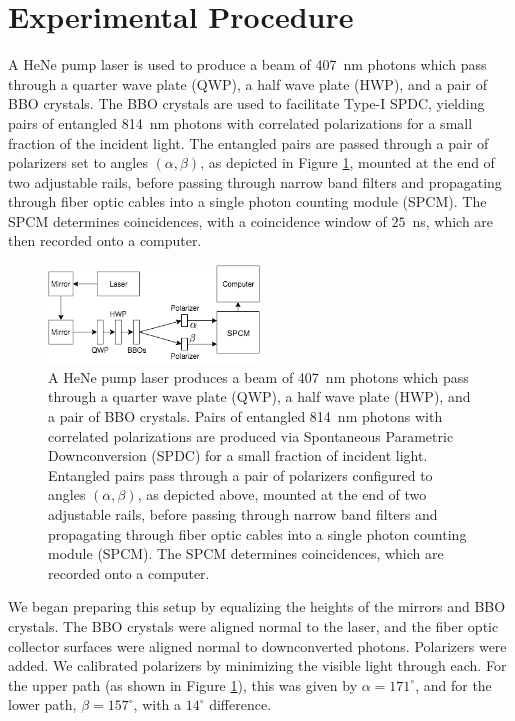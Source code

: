\documentclass{article}
\let\Oldsection\section
\renewcommand{\section}{\FloatBarrier\Oldsection}
\begin{document}
\section{Experimental Procedure}

A HeNe pump laser is used to produce a beam of 407~nm photons which pass through a quarter wave plate (QWP), a half wave plate (HWP), and a pair of BBO crystals. The BBO crystals are used to facilitate Type-I SPDC, yielding pairs of entangled 814~nm photons with correlated polarizations for a small fraction of the incident light. The entangled pairs are passed through a pair of polarizers set to angles $(\alpha, \beta)$, as depicted in Figure \ref{fig:setup}, mounted at the end of two adjustable rails, before passing through narrow band filters and propagating through fiber optic cables into a single photon counting module (SPCM). The SPCM determines coincidences, with a coincidence window of $25$~ns, which are then recorded onto a computer.

\begin{figure}[!h]
  \centering
  \includegraphics[width=0.5\textwidth]{setup}
  \caption{A HeNe pump laser produces a beam of 407~nm photons which pass through a quarter wave plate (QWP), a half wave plate (HWP), and a pair of BBO crystals. Pairs of entangled 814~nm photons with correlated polarizations are produced via Spontaneous Parametric Downconversion (SPDC) for a small fraction of incident light. Entangled pairs pass through a pair of polarizers configured to angles $(\alpha, \beta)$, as depicted above, mounted at the end of two adjustable rails, before passing through narrow band filters and propagating through fiber optic cables into a single photon counting module (SPCM). The SPCM determines coincidences, which are recorded onto a computer. \label{fig:setup}}
\end{figure}

We began preparing this setup by equalizing the heights of the mirrors and BBO crystals. The BBO crystals were aligned normal to the laser, and the fiber optic collector surfaces were aligned normal to downconverted photons. Polarizers were added. We calibrated polarizers by minimizing the visible light through each. For the upper path (as shown in Figure \ref{fig:setup}), this was given by $\alpha = 171^\circ$, and for the lower path, $\beta = 157^\circ$, with a $14^\circ$ difference.
\end{document}
